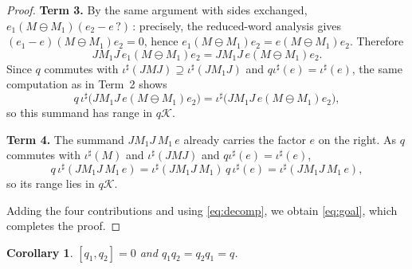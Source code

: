 \documentclass[a4paper, 11pt, reqno]{amsart}
\numberwithin{equation}{section}
\theoremstyle{plain}
\newtheorem{corollary}[thm]{Corollary}
\theoremstyle{remark}
\theoremstyle{definition}
\newcommand{\KK}{{\mathcal K}}
\begin{document}
\begin{proof}
\medskip\noindent\textbf{Term 3.}
By the same argument with sides exchanged, $e_1(M\ominus M_1)(e_2-e\,?)$\,: precisely, the reduced-word analysis gives $(e_1-e)(M\ominus M_1)e_2=0$, hence $e_1(M\ominus M_1)e_2=e(M\ominus M_1)e_2$. Therefore
\[
JM_1J\,e_1(M\ominus M_1)e_2=JM_1J\,e(M\ominus M_1)e_2 .
\]
Since $q$ commutes with $\iota^\sharp(JMJ)\supseteq\iota^\sharp(JM_1J)$ and $q\iota^\sharp(e)=\iota^\sharp(e)$, the same computation as in Term~2 shows
\[
q\,\iota^\sharp\big(JM_1J\,e(M\ominus M_1)e_2\big)=\iota^\sharp\big(JM_1J\,e(M\ominus M_1)e_2\big),
\]
so this summand has range in $q\KK$.

\medskip\noindent\textbf{Term 4.}
The summand $JM_1J\,M_1\,e$ already carries the factor $e$ on the right. As $q$ commutes with $\iota^\sharp(M)$ and $\iota^\sharp(JMJ)$ and $q\iota^\sharp(e)=\iota^\sharp(e)$,
\[
q\,\iota^\sharp(JM_1J\,M_1\,e)=\iota^\sharp(JM_1J\,M_1)\,q\,\iota^\sharp(e)=\iota^\sharp(JM_1J\,M_1\,e),
\]
so its range lies in $q\KK$.

\medskip
Adding the four contributions and using \eqref{eq:decomp}, we obtain \eqref{eq:goal}, which completes the proof.
\end{proof}

\begin{corollary}\label{cor:commute}
$[q_1,q_2]=0$ and $q_1q_2=q_2q_1=q$.
\end{corollary}
\end{document}
